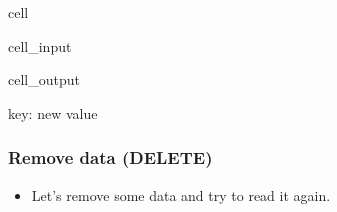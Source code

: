 \documentclass[letterpaper,10pt,english]{jupyterBook}
\begin{document}
\begin{sphinxuseclass}{cell}\begin{sphinxVerbatimInput}

\begin{sphinxuseclass}{cell_input}
\begin{sphinxVerbatim}[commandchars=\\\{\}]
  
   
   
\end{sphinxVerbatim}

\end{sphinxuseclass}\end{sphinxVerbatimInput}
\begin{sphinxVerbatimOutput}

\begin{sphinxuseclass}{cell_output}
\begin{sphinxVerbatim}[commandchars=\\\{\}]
\PYGZob{}\PYGZsq{}key\PYGZsq{}: \PYGZsq{}new value\PYGZsq{}\PYGZcb{}
\end{sphinxVerbatim}

\end{sphinxuseclass}\end{sphinxVerbatimOutput}

\end{sphinxuseclass}

\subsubsection{Remove data (DELETE)}
\label{\detokenize{2_Data_sources/APIs/REST:remove-data-delete}}\begin{itemize}
\item {} 
\sphinxAtStartPar
Let’s remove some data and try to read it again.

\end{itemize}
\end{document}
